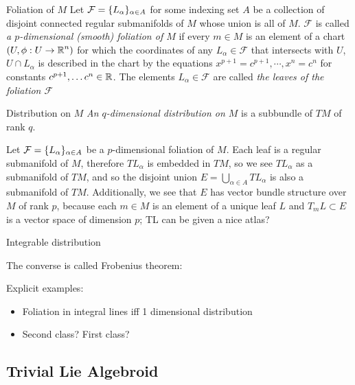 \begin{definition} {Foliation of $M$}
Let $\mathcal F = \{L_\alpha\}_{\alpha \in A}$ for some indexing set $A$ be a collection of disjoint connected regular submanifolds of $M$ whose union is all of $M$. $\mathcal F$ is called \emph{a $p$-dimensional (smooth) foliation of $M$} if every $m \in M$ is an element of a chart  $(U, \phi:U \to \operatorname{\mathbb{R}}^n)$ for which the coordinates of any $L_\alpha \in \mathcal F$ that intersects with $U$, $U \cap L_\alpha$ is described in the chart by the equations $x^{p+1} = c^{p+1}, \cdots , x^{n} = c^{n} $ for constants $c^{p+1}, \dots c^n \in \operatorname{\mathbb{R}}$. The elements $L_\alpha \in \mathcal F$ are called \emph{the leaves of the foliation $\mathcal F$}
\end{definition}

\begin{definition}{Distribution on $M$}
\emph{An $q$-dimensional distribution on $M$} is a subbundle of $TM$ of rank $q$.
\end{definition}

Let $\mathcal F = \{L_\alpha\}_{\alpha \in A}$ be a $p$-dimensional foliation of $M$. Each leaf is a regular submanifold of $M$, therefore $T L_\alpha$ is embedded in $TM$, so we see $T L_\alpha$ as a submanifold  of $TM$, and so the disjoint union $E = \bigcup_{\alpha \in A} T L_\alpha$ is also a submanifold of $TM$. Additionally, we see that $E$ has vector bundle structure over $M$ of rank $p$, because each $m \in M$ is an element of a unique leaf $L$ and $T_m L \subset E$ is a vector space of dimension $p$; TL can be given a nice atlas?

Integrable distribution

The converse is called Frobenius theorem:

Explicit examples:

\begin{itemize}
    \item Foliation in integral lines iff 1 dimensional distribution
    \item Second class? First class?
\end{itemize}

\subsection{Trivial Lie Algebroid}

